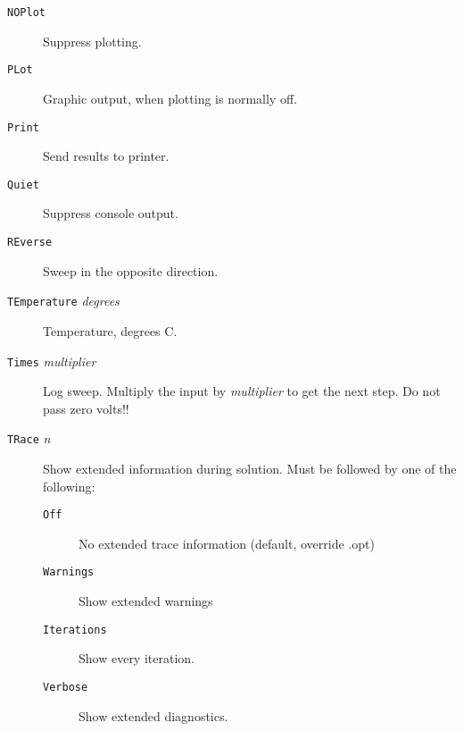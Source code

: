 \begin{description}


\item[{\tt NOPlot}] Suppress plotting.

\item[{\tt PLot}] Graphic output, when plotting is
normally off.

\item[{\tt Print}] Send results to printer.

\item[{\tt Quiet}] Suppress console output.


\item[{\tt REverse}] Sweep in the opposite direction.


\item[{\tt TEmperature} {\it degrees}] Temperature,
degrees C.

\item[{\tt Times} {\it multiplier}] Log sweep.  Multiply
the input by {\it multiplier} to get the next step.  Do
not pass zero volts!!

\item[{\tt TRace} {\it n}] Show extended information during solution.
Must be followed by one of the following:
\begin{description}
\item[{\tt Off}] No extended trace information (default, override .opt)
\item[{\tt Warnings}] Show extended warnings
\item[{\tt Iterations}] Show every iteration.
\item[{\tt Verbose}] Show extended diagnostics.
\end{description}


\end{description}
